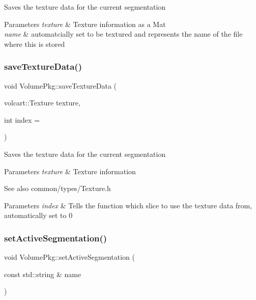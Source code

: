 Saves the texture data for the current segmentation 
\begin{DoxyParams}{Parameters}
{\em texture} & Texture information as a Mat \\
\hline
{\em name} & automatcially set to be textured and represents the name of the file where this is stored \\
\hline
\end{DoxyParams}
\hypertarget{classVolumePkg_a47e37208ab713dbc8d72b5e7f71636f4}{}\label{classVolumePkg_a47e37208ab713dbc8d72b5e7f71636f4} 
\subsubsection{\texorpdfstring{save\+Texture\+Data()}{saveTextureData()}\hspace{0.1cm}{\footnotesize\ttfamily [2/2]}}
{\footnotesize\ttfamily void Volume\+Pkg\+::save\+Texture\+Data (\begin{DoxyParamCaption}\item[{volcart\+::\+Texture}]{texture,  }\item[{int}]{index = {} }\end{DoxyParamCaption})\hspace{0.3cm}{\ttfamily [inline]}}

Saves the texture data for the current segmentation 
\begin{DoxyParams}{Parameters}
{\em texture} & Texture information \\
\hline
\end{DoxyParams}
\begin{DoxySeeAlso}{See also}
common/types/\+Texture.\+h 
\end{DoxySeeAlso}

\begin{DoxyParams}{Parameters}
{\em index} & Tells the function which slice to use the texture data from, automatically set to 0 \\
\hline
\end{DoxyParams}
\hypertarget{classVolumePkg_a2e64ca436996febd6ce9aed9edb0a59e}{}\label{classVolumePkg_a2e64ca436996febd6ce9aed9edb0a59e} 
\subsubsection{\texorpdfstring{set\+Active\+Segmentation()}{setActiveSegmentation()}}
{\footnotesize\ttfamily void Volume\+Pkg\+::set\+Active\+Segmentation (\begin{DoxyParamCaption}\item[{const std\+::string \&}]{name }\end{DoxyParamCaption})}

